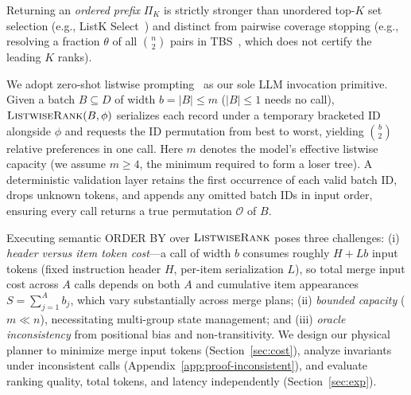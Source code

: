 Returning an \emph{ordered prefix} $\Pi_K$ is strictly stronger than unordered top-$K$ set selection (e.g., ListK Select~\cite{DBLP:journals/corr/abs-2603-17223}) and distinct from pairwise coverage stopping (e.g., resolving a fraction $\theta$ of all $\binom{n}{2}$ pairs in TBS~\cite{akinola2026tbs}, which does not certify the leading $K$ ranks).

We adopt zero-shot listwise prompting~\cite{DBLP:conf/emnlp/0001YMWRCYR23,DBLP:journals/corr/abs-2305-02156,DBLP:journals/corr/abs-2603-17223} as our sole LLM invocation primitive. Given a batch $B \subseteq D$ of width $b = |B| \le m$ ($|B|\le 1$ needs no call), $\textsc{ListwiseRank}(B,\phi)$ serializes each record under a temporary bracketed ID alongside $\phi$ and requests the ID permutation from best to worst, yielding $\binom{b}{2}$ relative preferences in one call. Here $m$ denotes the model's effective listwise capacity (we assume $m \ge 4$, the minimum required to form a loser tree). A deterministic validation layer retains the first occurrence of each valid batch ID, drops unknown tokens, and appends any omitted batch IDs in input order, ensuring every call returns a true permutation $\mathcal{O}$ of $B$.

Executing semantic \textsf{ORDER BY} over $\textsc{ListwiseRank}$ poses three challenges: (i) \emph{header versus item token cost}—a call of width $b$ consumes roughly $H + L b$ input tokens (fixed instruction header $H$, per-item serialization $L$), so total merge input cost across $A$ calls depends on both $A$ and cumulative item appearances $S = \sum_{j=1}^A b_j$, which vary substantially across merge plans; (ii) \emph{bounded capacity} ($m \ll n$), necessitating multi-group state management; and (iii) \emph{oracle inconsistency} from positional bias and non-transitivity. We design our physical planner to minimize merge input tokens (Section~\ref{sec:cost}), analyze invariants under inconsistent calls (Appendix~\ref{app:proof-inconsistent}), and evaluate ranking quality, total tokens, and latency independently (Section~\ref{sec:exp}).

